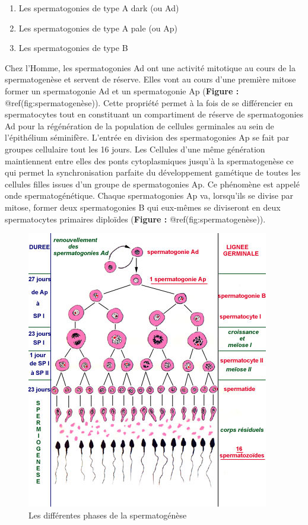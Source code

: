 \documentclass[12pt,twoside]{reedthesis}
\providecommand{\tightlist}{%
  \setlength{\itemsep}{0pt}\setlength{\parskip}{0pt}}
\theoremstyle{definition}
\theoremstyle{definition}
\theoremstyle{remark}
\begin{document}
  \begin{enumerate}
  \def\labelenumi{\arabic{enumi}.}
  \tightlist
  \item
    Les spermatogonies de type A dark (ou Ad)\\
  \item
    Les spermatogonies de type A pale (ou Ap)\\
  \item
    Les spermatogonies de type B
  \end{enumerate}
  
  Chez l'Homme, les spermatogonies Ad ont une activité mitotique au cours
  de la spermatogenèse et servent de réserve. Elles vont au cours d'une
  première mitose former un spermatogonie Ad et un spermatogonie Ap
  (\textbf{Figure :} @ref(fig:spermatogenèse)). Cette propriété permet à
  la fois de se différencier en spermatocytes tout en constituant un
  compartiment de réserve de spermatogonies Ad pour la régénération de la
  population de cellules germinales au sein de l'épithélium séminifère.
  L'entrée en division des spermatogonies Ap se fait par groupes
  cellulaire tout les 16 jours. Les Cellules d'une même génération
  maintiennent entre elles des ponts cytoplasmiques jusqu'à la
  spermatogenèse ce qui permet la synchronisation parfaite du
  développement gamétique de toutes les cellules filles issues d'un groupe
  de spermatogonies Ap. Ce phénomène est appelé onde spermatogénétique.
  Chaque spermatogonies Ap va, lorsqu'ils se divise par mitose, former
  deux spermatogonies B qui eux-mêmes se diviseront en deux spermatocytes
  primaires diploïdes (\textbf{Figure :} @ref(fig:spermatogenèse)).
  
  \begin{figure}
  
  {\centering \includegraphics[scale=0.75]{figure/spermatogenese} 
  
  }
  
  \caption{Les différentes phases de la spermatogénèse}\label{fig:spermatogenese}
  \end{figure}
  
\end{document}
